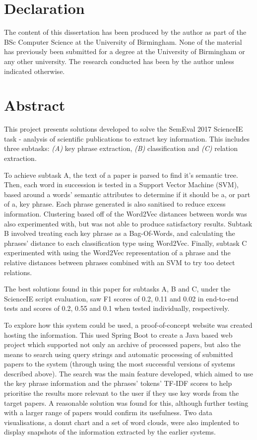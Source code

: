 \documentclass[a4paper]{report}
\begin{document}

\section*{Declaration}
The content of this dissertation has been produced by the author as part of the BSc Computer Science at the University of Birmingham. None of the material has previously been submitted for a degree at the University of Birmingham or any other university. The research conducted has been by the author unless indicated otherwise.

\pagebreak

\section*{Abstract}
This project presents solutions developed to solve the SemEval 2017 ScienceIE task - analysis of scientific publications to extract key information. This includes three subtasks: \textit{(A)} key phrase extraction, \textit{(B)} classification and \textit{(C)} relation extraction.

To achieve subtask A, the text of a paper is parsed to find it's semantic tree. Then, each word in succession is tested in a Support Vector Machine (SVM), based around a words' semantic attributes to determine if it should be a, or part of a, key phrase. Each phrase generated is also sanitised to reduce excess information. Clustering based off of the Word2Vec distances between words was also experimented with, but was not able to produce satisfactory results. Subtask B involved treating each key phrase as a Bag-Of-Words, and calculating the phrases' distance to each classification type using Word2Vec. Finally, subtask C experimented with using the Word2Vec representation of a phrase and the relative distances between phrases combined with an SVM to try too detect relations.

The best solutions found in this paper for subtasks A, B and C, under the ScienceIE script evaluation, saw F1 scores of 0.2, 0.11 and 0.02 in end-to-end tests and scores of 0.2, 0.55 and 0.1 when tested individually, respectively. 

To explore how this system could be used, a proof-of-concept website was created hosting the information. This used Spring Boot to create a Java based web project which supported not only an archive of processed papers, but also the means to search using query strings and automatic processing of submitted papers to the system (through using the most successful versions of systems described above). The search was the main feature developed, which aimed to use the key phrase information and the phrases' tokens' TF-IDF scores to help prioritise the results more relevant to the user if they use key words from the target papers. A reasonable solution was found for this, although further testing with a larger range of papers would confirm its usefulness. Two data visualisations, a donut chart and a set of word clouds, were also implented to display snapshots of the information extracted by the earlier systems. \\
\end{document}
